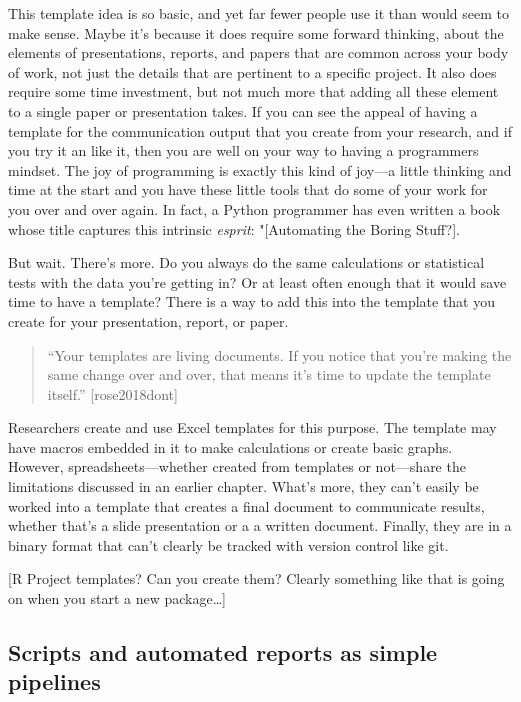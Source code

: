 \documentclass[]{tufte-book}
\begin{document}
This template idea is so basic, and yet far fewer people use it than would seem
to make sense. Maybe it's because it does require some forward thinking, about
the elements of presentations, reports, and papers that are common across your
body of work, not just the details that are pertinent to a specific project. It
also does require some time investment, but not much more that adding all these
element to a single paper or presentation takes. If you can see the appeal of
having a template for the communication output that you create from your
research, and if you try it an like it, then you are well on your way to having
a programmers mindset. The joy of programming is exactly this kind of joy---a
little thinking and time at the start and you have these little tools that do
some of your work for you over and over again. In fact, a Python programmer has
even written a book whose title captures this intrinsic \emph{esprit}: "{[}Automating
the Boring Stuff?{]}.

But wait. There's more. Do you always do the same calculations or statistical
tests with the data you're getting in? Or at least often enough that it would
save time to have a template? There is a way to add this into the template that
you create for your presentation, report, or paper.

\begin{quote}
``Your templates are living documents. If you notice that you're making the same
change over and over, that means it's time to update the template itself.''
{[}rose2018dont{]}
\end{quote}

Researchers create and use Excel templates for this purpose. The template
may have macros embedded in it to make calculations or create basic graphs.
However, spreadsheets---whether created from templates or not---share
the limitations discussed in an earlier chapter. What's more, they can't
easily be worked into a template that creates a final document to
communicate results, whether that's a slide presentation or a
a written document. Finally, they are in a binary format that can't
clearly be tracked with version control like git.

{[}R Project templates? Can you create them? Clearly something like that is
going on when you start a new package\ldots{}{]}

\hypertarget{scripts-and-automated-reports-as-simple-pipelines}{%
\subsection{Scripts and automated reports as simple pipelines}\label{scripts-and-automated-reports-as-simple-pipelines}}
\end{document}
